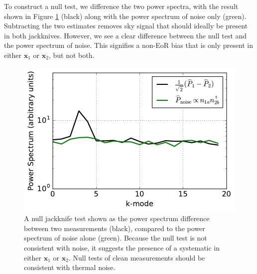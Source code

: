 \documentclass[preprint2,numberedappendix,tighten]{aastex6}  %
\begin{document}
To construct a null test, we difference the two power spectra, with the result shown in Figure \ref{fig:toy_bias1} (black) along with the power spectrum of noise only (green). Subtracting the two estimates removes sky signal that should ideally be present in both jackknives. However, we see a clear difference between the null test and the power spectrum of 
noise. This signifies a non-EoR bias that is only present in either $\textbf{x}_{1}$ or $\textbf{x}_{2}$, but not both.

\begin{figure}
	\centering
	\includegraphics[trim={0cm 0cm 0cm 0cm},width=\columnwidth]{plots/toy_bias1.pdf}
	\caption{A null jackknife test shown as the power spectrum difference between two measurements (black), compared to the power spectrum of noise alone (green). Because the null test is not consistent with noise, it suggests the 
presence of a systematic in either $\textbf{x}_{1}$ or $\textbf{x}_{2}$. Null tests of clean measurements should be consistent 
with thermal noise.}
	\label{fig:toy_bias1}
\end{figure}
\end{document}
